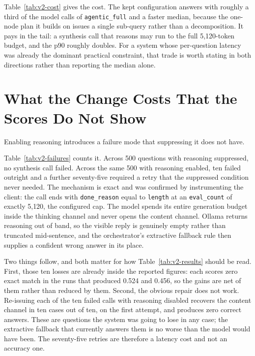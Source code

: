 

Table~\ref{tab:v2-cost} gives the cost. The kept configuration answers with
roughly a third of the model calls of \texttt{agentic\_full} and a faster
median, because the one-node plan it builds on issues a single sub-query rather
than a decomposition. It pays in the tail: a synthesis call that reasons may run
to the full 5{,}120-token budget, and the p90 roughly doubles. For a system
whose per-question latency was already the dominant practical constraint, that
trade is worth stating in both directions rather than reporting the median
alone.

\section{What the Change Costs That the Scores Do Not Show}
\label{sec:improvement-caveat}

Enabling reasoning introduces a failure mode that suppressing it does not have.



Table~\ref{tab:v2-failures} counts it. Across 500 questions with reasoning
suppressed, no synthesis call failed. Across the same 500 with reasoning
enabled, ten failed outright and a further seventy-five required a retry that
the suppressed condition never needed. The mechanism is exact and was confirmed
by instrumenting the client: the call ends with \texttt{done\_reason} equal to
\texttt{length} at an \texttt{eval\_count} of exactly 5{,}120, the configured
cap. The model spends its entire generation budget inside the thinking channel
and never opens the content channel. Ollama returns reasoning out of band, so
the visible reply is genuinely empty rather than truncated mid-sentence, and the
orchestrator's extractive fallback rule then supplies a confident wrong answer
in its place.

Two things follow, and both matter for how Table~\ref{tab:v2-results} should be
read. First, those ten losses are already inside the reported figures: each
scores zero exact match in the runs that produced 0.524 and 0.456, so the gains
are net of them rather than reduced by them. Second, the obvious repair does not
work. Re-issuing each of the ten failed calls with reasoning disabled recovers
the content channel in ten cases out of ten, on the first attempt, and produces
zero correct answers. These are questions the system was going to lose in any
case; the extractive fallback that currently answers them is no worse than the
model would have been. The seventy-five retries are therefore a latency cost and
not an accuracy one.

